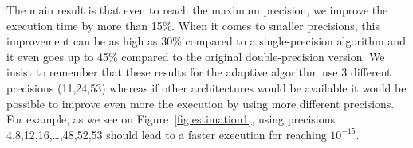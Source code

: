    The main result is that even to reach the maximum precision, we improve the execution time by more than 15\%. When it comes to smaller precisions, this improvement can be as high as 30\% compared to
   a single-precision algorithm and it even goes up to 45\% compared to the original double-precision version. We insist to remember that these results for the adaptive algorithm use 3 different precisions (11,24,53)
   whereas if other architectures would be available it would be possible to improve even more the execution by using more different precisions. For example, as we see on Figure~\ref{fig.estimation1}, using precisions
   4,8,12,16,\dots,48,52,53 should lead to a faster execution for reaching $10^{-15}$.
